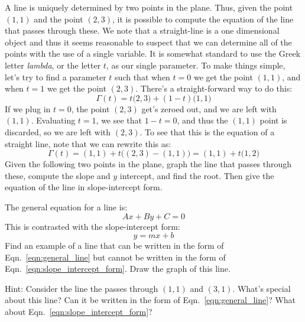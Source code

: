 \documentclass[crop=false,class=book,oneside]{standalone}                      %
\begin{document}
            \begin{lexample}
                A line is uniquely determined by two points in the plane.
                Thus, given the point $(1,1)$ and the point $(2,3)$, it is
                possible to compute the equation of the line that passes through
                these. We note that a straight-line is a one dimensional object
                and thus it seems reasonable to suspect that we can determine
                all of the points with the use of a single variable. It is
                somewhat standard to use the Greek letter \textit{lambda}, or
                the letter $t$, as our single parameter. To make things simple,
                let's try to find a parameter $t$ such that when $t=0$ we get
                the point $(1,1)$, and when $t=1$ we get the point $(2,3)$.
                There's a straight-forward way to do this:
                \begin{equation}
                    \Gamma(t)=t\big(2,3\big)+(1-t)\big(1,1\big)
                \end{equation}
                If we plug in $t=0$, the point $(2,3)$ get's zeroed out, and
                we are left with $(1,1)$. Evaluating $t=1$, we see that
                $1-t=0$, and thus the $(1,1)$ point is discarded, so we are
                left with $(2,3)$. To see that this is the equation of a
                straight line, note that we can rewrite this as:
                \begin{equation}
                    \Gamma(t)=(1,1)+t\big((2,3)-(1,1)\big)
                             =(1,1)+t\big(1,2\big)
                \end{equation}
                Given the following two points in the plane,
                graph the line that passes through these, compute
                the slope and $y$ intercept, and find the root.
                Then give the equation of the line in slope-intercept
                form.
            \end{lexample}
        \begin{problem}
            The general equation for a line is:
            \begin{equation}
                \label{eqn:general_line}%
                Ax+By+C=0
            \end{equation}
            This is contrasted with the slope-intercept form:
            \begin{equation}
                \label{eqn:slope_intercept_form}%
                y=mx+b
            \end{equation}
            Find an example of a line that can be written
            in the form of Eqn.~\ref{eqn:general_line} but
            cannot be written in the form of
            Eqn.~\ref{eqn:slope_intercept_form}. Draw the graph of
            this line.
            \par
            Hint: Consider the line the passes through
            $(1,1)$ and $(3,1)$. What's special about this line?
            Can it be written in the form of
            Eqn.~\ref{eqn:general_line}? What about
            Eqn.~\ref{eqn:slope_intercept_form}?
        \end{problem}
\end{document}
